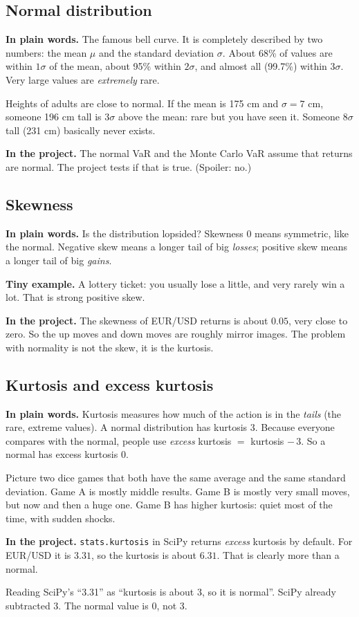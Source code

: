 \documentclass[11pt,a4paper]{article}
\newcommand{\term}[1]{\subsection{#1}}
\newcommand{\plain}{\textbf{In plain words.} }
\newcommand{\inproj}{\textbf{In the project.} }
\newcommand{\tinyex}{\textbf{Tiny example.} }
\newcommand{\code}[1]{\texttt{#1}}
\begin{document}
\term{Normal distribution}\label{g:normal}
\plain The famous bell curve. It is completely described by two numbers:
the mean $\mu$ and the standard deviation $\sigma$. About 68\% of values are
within $1\sigma$ of the mean, about 95\% within $2\sigma$, and almost all
(99.7\%) within $3\sigma$. Very large values are \emph{extremely} rare.

\begin{example}
Heights of adults are close to normal. If the mean is 175 cm and
$\sigma=7$ cm, someone 196 cm tall is $3\sigma$ above the mean: rare but you
have seen it. Someone $8\sigma$ tall (231 cm) basically never exists.
\end{example}

\inproj The normal VaR and the Monte Carlo VaR assume that returns are
normal. The project tests if that is true. (Spoiler: no.)

\term{Skewness}\label{g:skew}
\plain Is the distribution lopsided? Skewness 0 means symmetric, like the
normal. Negative skew means a longer tail of big \emph{losses}; positive
skew means a longer tail of big \emph{gains}.

\tinyex A lottery ticket: you usually lose a little, and very rarely win a lot.
That is strong positive skew.

\inproj The skewness of EUR/USD returns is about $0.05$, very close to zero.
So the up moves and down moves are roughly mirror images. The problem with
normality is not the skew, it is the kurtosis.

\term{Kurtosis and excess kurtosis}\label{g:kurt}
\plain Kurtosis measures how much of the action is in the \emph{tails}
(the rare, extreme values). A normal distribution has kurtosis 3. Because
everyone compares with the normal, people use \emph{excess} kurtosis
$=$ kurtosis $-\,3$. So a normal has excess kurtosis 0.

\begin{example}
Picture two dice games that both have the same average and the same
standard deviation. Game A is mostly middle results. Game B is mostly very
small moves, but now and then a huge one. Game B has higher kurtosis: quiet
most of the time, with sudden shocks.
\end{example}

\inproj \code{stats.kurtosis} in SciPy returns \emph{excess} kurtosis by
default. For EUR/USD it is $3.31$, so the kurtosis is about $6.31$. That is
clearly more than a normal.

\begin{mistake}
Reading SciPy's ``3.31'' as ``kurtosis is about 3, so it is normal''. SciPy
already subtracted 3. The normal value is 0, not 3.
\end{mistake}
\end{document}
